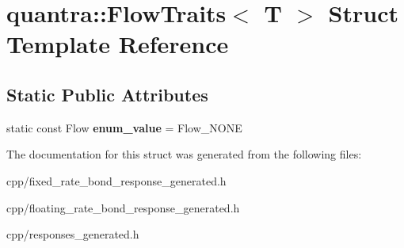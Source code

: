 \hypertarget{structquantra_1_1FlowTraits}{}\section{quantra\+:\+:Flow\+Traits$<$ T $>$ Struct Template Reference}
\label{structquantra_1_1FlowTraits}
\subsection*{Static Public Attributes}
\begin{DoxyCompactItemize}
\item 
\mbox{\label{structquantra_1_1FlowTraits_a0bf1ce6e018e9fa538a291dd47e2c89c}} 
static const Flow {\bfseries enum\+\_\+value} = Flow\+\_\+\+N\+O\+NE
\end{DoxyCompactItemize}


The documentation for this struct was generated from the following files\+:\begin{DoxyCompactItemize}
\item 
cpp/fixed\+\_\+rate\+\_\+bond\+\_\+response\+\_\+generated.\+h\item 
cpp/floating\+\_\+rate\+\_\+bond\+\_\+response\+\_\+generated.\+h\item 
cpp/responses\+\_\+generated.\+h\end{DoxyCompactItemize}
